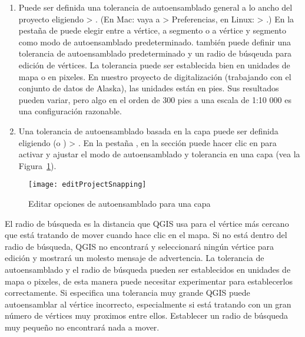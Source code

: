 \begin{enumerate}
\item Puede ser definida una tolerancia de autoensamblado general a lo ancho del proyecto eligiendo
 > . 
(En Mac: vaya a   > Preferencias, en Linux:  > .)
En la pesta\~na de  puede elegir entre a v\'ertice, a segmento o  a v\'ertice y
segmento como modo de autoensamblado predeterminado. también puede definir una tolerancia de
autoensamblado predeterminado y un radio de b\'usqeuda para edici\'on de v\'ertices. La tolerancia puede ser establecida bien
en unidades de mapa o en pixeles.
En nuestro proyecto de digitalizaci\'on (trabajando con el conjunto de datos de Alaska),
las unidades est\'an en pies. Sus resultados pueden variar, pero algo en el
orden de 300 pies a una escala de 1:10 000 es una configuraci\'on razonable.
\item Una tolerancia de autoensamblado basada en la capa puede ser definida eligiendo
 (o ) > . En la pesta\~na , en la secci\'on  puede hacer clic
en  para activar y ajustar el modo de autoensamblado
y tolerancia en una capa (vea la Figura~\ref{fig:snappingoptions}).
\end{enumerate}

\begin{figure}[H]
   \begin{center}
   \caption{Editar opciones de autoensamblado para una capa \nixcaption}\label{fig:snappingoptions}\smallskip
   \texttt{[image: editProjectSnapping]} 
\end{center}  
\end{figure}


El radio de b\'usqueda es la distancia que QGIS usa para  el v\'ertice
más cercano que est\'a tratando de mover cuando hace clic en el
mapa. Si no est\'a dentro del radio de b\'usqueda, QGIS no encontrar\'a y seleccionar\'a
ning\'un v\'ertice para edici\'on y mostrar\'a un molesto mensaje de advertencia.
La tolerancia de autoensamblado y el radio de b\'usqueda pueden ser establecidos en unidades de mapa o pixeles, de esta manera puede
necesitar experimentar para establecerlos correctamente. Si especifica una tolerancia muy grande
QGIS puede autoensamblar al v\'ertice incorrecto, especialmente si est\'a tratando
con un gran n\'umero de v\'ertices muy proximos entre ellos. Establecer un radio de b\'usqueda muy
peque\~no no encontrar\'a nada a mover.

